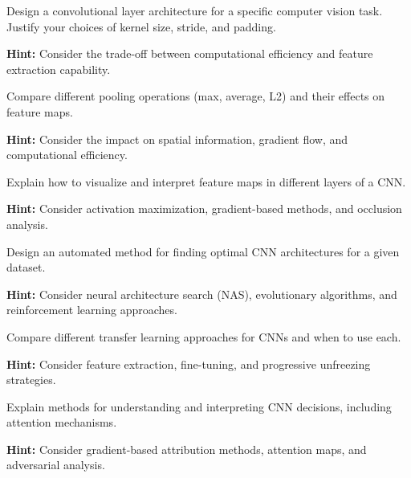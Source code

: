 \begin{problem}
Design a convolutional layer architecture for a specific computer vision task. Justify your choices of kernel size, stride, and padding.

\textbf{Hint:} Consider the trade-off between computational efficiency and feature extraction capability.
\end{problem}

\begin{problem}
Compare different pooling operations (max, average, L2) and their effects on feature maps.

\textbf{Hint:} Consider the impact on spatial information, gradient flow, and computational efficiency.
\end{problem}

\begin{problem}
Explain how to visualize and interpret feature maps in different layers of a CNN.

\textbf{Hint:} Consider activation maximization, gradient-based methods, and occlusion analysis.
\end{problem}

\begin{problem}
Design an automated method for finding optimal CNN architectures for a given dataset.

\textbf{Hint:} Consider neural architecture search (NAS), evolutionary algorithms, and reinforcement learning approaches.
\end{problem}

\begin{problem}
Compare different transfer learning approaches for CNNs and when to use each.

\textbf{Hint:} Consider feature extraction, fine-tuning, and progressive unfreezing strategies.
\end{problem}

\begin{problem}
Explain methods for understanding and interpreting CNN decisions, including attention mechanisms.

\textbf{Hint:} Consider gradient-based attribution methods, attention maps, and adversarial analysis.
\end{problem}

